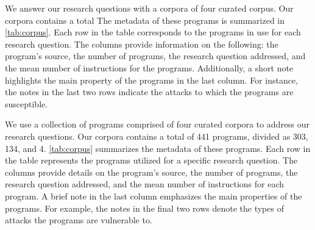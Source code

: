 We answer our research questions with a corpora of four curated corpus.
Our corpora contains a total 
The metadata of these programs is summarized in \autoref{tab:corpus}.
Each row in the table corresponds to the programs in use for each research question. 
The columns provide information on the following: the program's source, the number of programs, the research question addressed, and the mean number of instructions for the programs. 
Additionally, a short note highlights the main property of the programs in the last column. 
For instance, the notes in the last two rows indicate the attacks to which the programs are susceptible.

We use a collection of programs comprised of four curated corpora to address our research questions. 
Our corpora contains a total of 441 programs, divided as 303, 134, and 4. 
\autoref{tab:corpus} summarizes the metadata of these programs. 
Each row in the table represents the programs utilized for a specific research question. 
The columns provide details on the program's source, the number of programs, the research question addressed, and the mean number of instructions for each program. 
A brief note in the last column emphasizes the main properties of the programs. 
For example, the notes in the final two rows denote the types of attacks the programs are vulnerable to.
